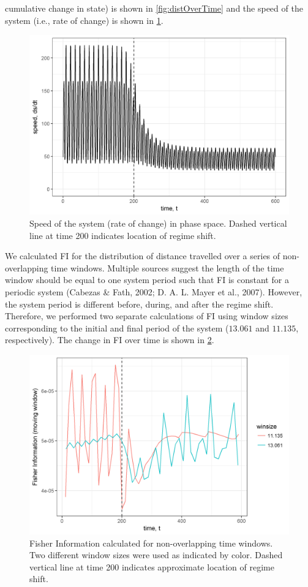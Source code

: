 \documentclass[12pt,twoside,openany]{reedthesis}
\begin{document}
cumulative change in state) is shown in \ref{fig:distOverTime} and the
speed of the system (i.e., rate of change) is shown in
\ref{fig:dsdtOverTime}.
\begin{figure}

{\centering \includegraphics[width=0.85\linewidth]{./chapterFiles/fiGuide/figures/dsdtOverTime} 

}

\caption{Speed of the system (rate of change) in phase space. Dashed vertical line at time 200 indicates location of regime shift.}\label{fig:dsdtOverTime}
\end{figure}
We calculated FI for the distribution of distance travelled over a
series of non-overlapping time windows. Multiple sources suggest the
length of the time window should be equal to one system period such that
FI is constant for a periodic system (Cabezas \& Fath, 2002; D. A. L.
Mayer et al., 2007). However, the system period is different before,
during, and after the regime shift. Therefore, we performed two separate
calculations of FI using window sizes corresponding to the initial and
final period of the system (\(13.061\) and \(11.135\), respectively).
The change in FI over time is shown in \ref{fig:fiOverTime}.
\begin{figure}

{\centering \includegraphics[width=0.85\linewidth]{./chapterFiles/fiGuide/figures/fiOverTime} 

}

\caption{Fisher Information calculated for non-overlapping time windows. Two different window sizes were used as indicated by color. Dashed vertical line at time 200 indicates approximate location of regime shift.}\label{fig:fiOverTime}
\end{figure}
\end{document}
